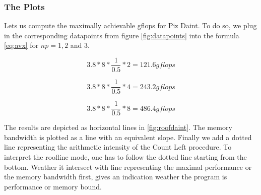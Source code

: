 \documentclass[]{article}
\begin{document}
\subsubsection{The Plots}

Lets us compute the maximally achievable gflops for Piz Daint. To do so, we plug in the corresponding datapoints from figure \ref{fig:datapoints} into the formula \ref{eq:avx} for $np = 1, 2$ and $3$.

\begin{center}
	\begin{equation}
		3.8 * 8 * \frac{1}{0.5} * 2 = 121.6 gflops
	\end{equation}
	\label{eq:daintp1}
\end{center}

\begin{center}
	\begin{equation}
		3.8 * 8 * \frac{1}{0.5} * 4 = 243.2 gflops
	\end{equation}
	\label{eq:daintp2}
\end{center}

\begin{center}
	\begin{equation}
		3.8 * 8 * \frac{1}{0.5} * 8 = 486.4 gflops
	\end{equation}
	\label{eq:daintp3}
\end{center}

The results are depicted as horizontal lines in \ref{fig:roofdaint}. The memory bandwidth is plotted as a line with an equivalent slope. Finally we add a dotted line representing the arithmetic intensity of the Count Left procedure. 
To interpret the roofline mode, one has to follow the dotted line starting from the bottom. Weather it intersect with line representing the maximal performance or the memory bandwidth first, gives an indication weather the program is performance or memory bound. 
\end{document}
